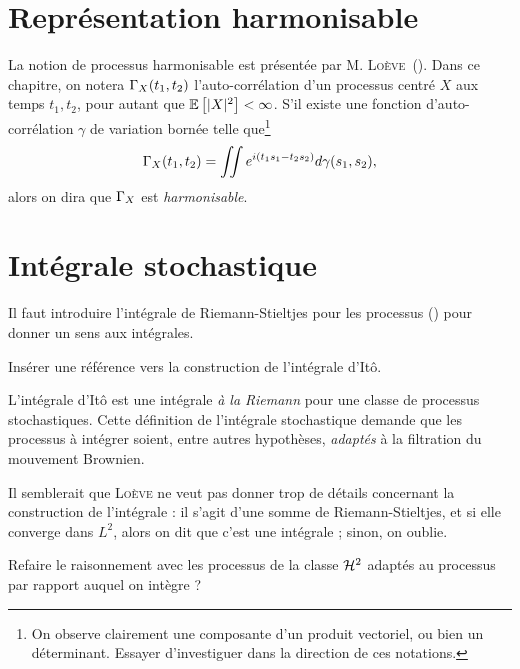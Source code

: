 \section{Représentation harmonisable}
La notion de processus harmonisable est présentée par
M. \textsc{Loève}~(\cite{loeve1978}). Dans ce chapitre, on notera
$\Gamma_X(t_1,t_2)$ l'auto-corrélation d'un processus centré $X$ aux
temps $t_1, t_2$, pour autant que $\mathbb{E}\left[|X|^2\right] < \infty$. S'il existe
une fonction d'auto-corrélation $\gamma$ de variation bornée telle
que\footnote{On observe clairement une composante d'un produit
  vectoriel, ou bien un déterminant. Essayer d'investiguer dans la
  direction de ces notations.}
\[ \Gamma_X(t_1,t_2) = \iint e^{i(t_1s_1 - t_2s_2)} d\gamma(s_1,s_2)
  ,\] alors on dira que $\Gamma_X$ est \emph{harmonisable}.

\section{Intégrale stochastique}

\begin{prerequis}
  Il faut introduire l'intégrale de Riemann-Stieltjes pour les
  processus (\cite[p.~138]{loeve1978}) pour donner un sens aux
  intégrales.
\end{prerequis}

\begin{alert}
  Insérer une référence vers la construction de l'intégrale d'Itô.
\end{alert}

L'intégrale d'Itô est une intégrale \emph{\og à la Riemann \fg{}} pour
une classe de processus stochastiques. Cette définition de l'intégrale
stochastique demande que les processus à intégrer soient, entre autres
hypothèses, \emph{adaptés} à la filtration du mouvement Brownien.

\begin{alert}
  Il semblerait que \textsc{Loève} ne veut pas donner trop de détails
  concernant la construction de l'intégrale : il s'agit d'une somme de
  Riemann-Stieltjes, et si elle converge dans $L^2$, alors on dit que
  c'est une intégrale ; sinon, on oublie.
\end{alert}

\begin{question}
  Refaire le raisonnement avec les processus de la classe $\mathcal{H}^2$
  adaptés au processus par rapport auquel on intègre ?
\end{question}


